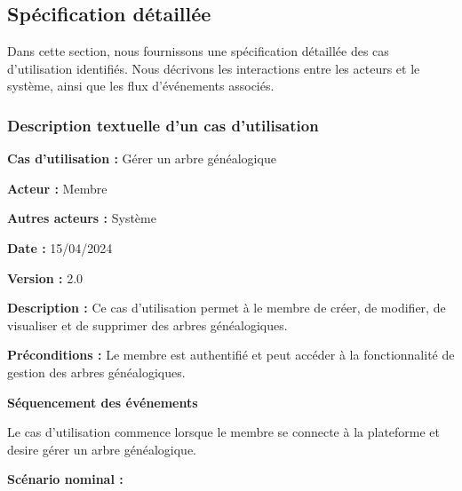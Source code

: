 \newpage
\subsection{Spécification détaillée }
Dans cette section, nous fournissons une spécification détaillée des cas
d’utilisation identifiés. Nous décrivons les interactions entre les acteurs et
le système, ainsi que les flux d’événements associés.

\subsubsection{Description textuelle d'un cas d'utilisation}
\textbf{Cas d’utilisation :} Gérer un arbre généalogique

\textbf{Acteur :} Membre

\textbf{Autres acteurs :} Système

\textbf{Date :} 15/04/2024

\textbf{Version :} 2.0

\textbf{Description :} Ce cas d’utilisation permet à le membre de créer,
de modifier, de visualiser et de supprimer des arbres généalogiques.

\textbf{Préconditions :} Le membre est authentifié et peut accéder à la
fonctionnalité de gestion des arbres généalogiques.

\textbf{Séquencement des événements}

Le cas d’utilisation commence lorsque le membre se connecte à la plateforme
et desire gérer un arbre généalogique.

\textbf{Scénario nominal :}

